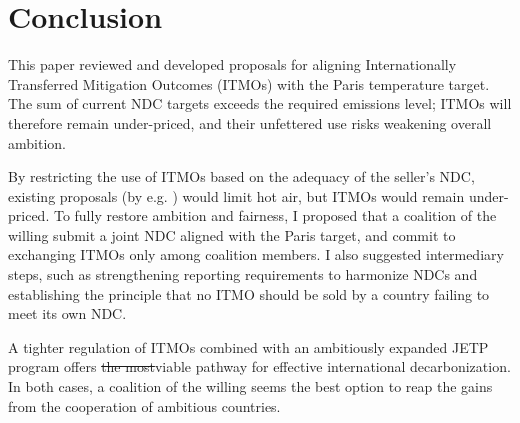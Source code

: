 \documentclass[12pt,english]{article}
\makeatletter
\providecommand{\DIFaddtex}[1]{{\protect\color{blue}\uwave{#1}}} %
\providecommand{\DIFdeltex}[1]{{\protect\color{red}\sout{#1}}} %
\providecommand{\DIFaddend}{} %
\providecommand{\DIFdelend}{} %
\providecommand{\DIFadd}[1]{\texorpdfstring{\DIFaddtex{#1}}{#1}} %
\providecommand{\DIFdel}[1]{\texorpdfstring{\DIFdeltex{#1}}{}} %
\DeclareRobustCommand{\DIFaddend}{\DIFOaddend \let\includegraphics\DIFOincludegraphics} %
\DeclareRobustCommand{\DIFdelend}{\DIFOaddend \let\includegraphics\DIFOincludegraphics} %
\let\sout@orig\sout %
\renewcommand{\sout}[1]{\ifmmode\text{\sout@orig{\ensuremath{#1}}}\else\sout@orig{#1}\fi} %
\makeatother
\begin{document}
\section{Conclusion\label{sec:conclusion}}

This paper reviewed and developed proposals for aligning Internationally Transferred Mitigation Outcomes (ITMOs) with the Paris temperature target. The sum of current NDC targets exceeds the required emissions level; ITMOs will therefore remain under-priced, and their unfettered use risks weakening overall ambition.

By restricting the use of ITMOs based on the adequacy of the seller's NDC, existing proposals (by e.g. \citealp{michaelowa_additionality_2019}) would limit hot air, but ITMOs would remain under-priced. To fully restore ambition and fairness, I proposed that a coalition of the willing submit a joint NDC aligned with the Paris target, and commit to exchanging ITMOs only among coalition members. I also suggested intermediary steps, such as strengthening reporting requirements to harmonize NDCs and establishing the principle that no ITMO should be sold by a country failing to meet its own NDC.

A tighter regulation of ITMOs combined with an ambitiously expanded JETP program \citep{steckel_climate_2017,bolton_why_2025} offers \DIFdel{the most}\DIFdelend \DIFadd{a }\DIFaddend viable pathway for effective international decarbonization. In both cases, a coalition of the willing seems the best option to reap the gains from the cooperation of ambitious countries. 



\end{document}
